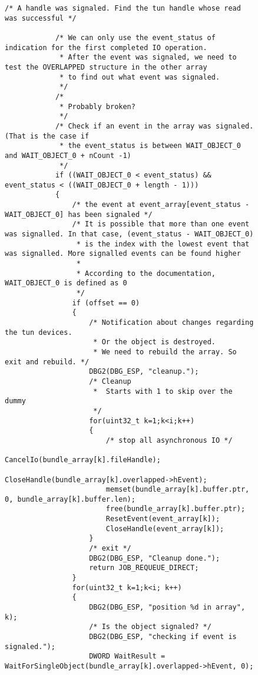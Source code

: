 \begin{figure}
\begin{lstlisting}[caption=Code für handle\_plain auf Windows]
            /* A handle was signaled. Find the tun handle whose read was successful */

            /* We can only use the event_status of indication for the first completed IO operation.
             * After the event was signaled, we need to test the OVERLAPPED structure in the other array
             * to find out what event was signaled.
             */
            /*
             * Probably broken?
             */
            /* Check if an event in the array was signaled. (That is the case if
             * the event_status is between WAIT_OBJECT_0 and WAIT_OBJECT_0 + nCount -1)
             */
            if ((WAIT_OBJECT_0 < event_status) && event_status < ((WAIT_OBJECT_0 + length - 1)))
            {
                /* the event at event_array[event_status - WAIT_OBJECT_0] has been signaled */
                /* It is possible that more than one event was signalled. In that case, (event_status - WAIT_OBJECT_0)
                 * is the index with the lowest event that was signalled. More signalled events can be found higher
                 *
                 * According to the documentation, WAIT_OBJECT_0 is defined as 0
                 */
                if (offset == 0)
                {
                    /* Notification about changes regarding the tun devices.
                     * Or the object is destroyed.
                     * We need to rebuild the array. So exit and rebuild. */
                    DBG2(DBG_ESP, "cleanup.");
                    /* Cleanup
                     *  Starts with 1 to skip over the dummy
                     */
                    for(uint32_t k=1;k<i;k++)
                    {
                        /* stop all asynchronous IO */
                        CancelIo(bundle_array[k].fileHandle);
                        CloseHandle(bundle_array[k].overlapped->hEvent);
                        memset(bundle_array[k].buffer.ptr, 0, bundle_array[k].buffer.len);
                        free(bundle_array[k].buffer.ptr);
                        ResetEvent(event_array[k]);
                        CloseHandle(event_array[k]);
                    }
                    /* exit */
                    DBG2(DBG_ESP, "Cleanup done.");
                    return JOB_REQUEUE_DIRECT;
                }
                for(uint32_t k=1;k<i; k++)
                {
                    DBG2(DBG_ESP, "position %d in array", k);
                    /* Is the object signaled? */
                    DBG2(DBG_ESP, "checking if event is signaled.");
                    DWORD WaitResult = WaitForSingleObject(bundle_array[k].overlapped->hEvent, 0);

\end{lstlisting}
\end{figure}
